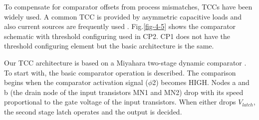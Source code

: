 To compensate for comparator offsets from process mismatches, TCCs have been widely used. 
A common TCC is provided by asymmetric capacitive loads \cite{nuzzo-thresholdconfiguring} \cite{verbruggen-dynamicpipeline} and also current sources are frequently used \cite{miyahara2008low} \cite{el-chammas-tcc}. Fig.\ref{fig-4-5} shows the comparator schematic with threshold configuring used in CP2. CP1 does not have the threshold configuring element but the basic architecture is the same. 

Our TCC architecture is based on a Miyahara two-stage dynamic comparator \cite{miyahara2008low}. To start with, the basic comparator operation is described.  The comparison begins when the comparator activation signal ($\phi$2) becomes HIGH. Nodes a and b (the drain node of the input transistors MN1 and MN2) drop with its speed proportional to the gate voltage of the input transistors. When either drops $V_{latch}$, the second stage latch operates and the output is decided.


